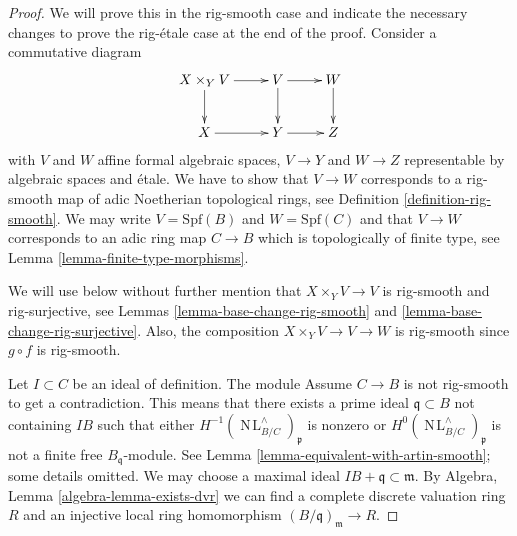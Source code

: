 \documentclass{stacks-project}
\theoremstyle{plain}
\theoremstyle{definition}
\theoremstyle{remark}
\numberwithin{equation}{subsection}
\def\NL{\mathop{N\!L}\nolimits}
\begin{document}
\begin{proof}
We will prove this in the rig-smooth case and indicate the necessary
changes to prove the rig-\'etale case at the end of the proof.
Consider a commutative diagram
$$
\xymatrix{
X \times_Y V \ar[r] \ar[d] &
V \ar[d] \ar[r] &
W \ar[d] \\
X \ar[r] &
Y \ar[r] &
Z
}
$$
with $V$ and $W$ affine formal algebraic spaces, $V \to Y$ and $W \to Z$
representable by algebraic spaces and \'etale. We have to show that
$V \to W$ corresponds to a rig-smooth map of adic Noetherian topological
rings, see Definition \ref{definition-rig-smooth}.
We may write $V = \text{Spf}(B)$ and $W = \text{Spf}(C)$ and that
$V \to W$ corresponds to an adic ring map $C \to B$ which is topologically
of finite type, see Lemma \ref{lemma-finite-type-morphisms}.

\medskip\noindent
We will use below without further mention that $X \times_Y V \to V$
is rig-smooth and rig-surjective, see
Lemmas \ref{lemma-base-change-rig-smooth} and
\ref{lemma-base-change-rig-surjective}.
Also, the composition $X \times_Y V \to V \to W$ is rig-smooth
since $g \circ f$ is rig-smooth.

\medskip\noindent
Let $I \subset C$ be an ideal of definition. The module
Assume $C \to B$ is not rig-smooth to get a contradiction.
This means that there exists a prime ideal $\mathfrak q \subset B$
not containing $IB$ such that either $H^{-1}(\NL_{B/C}^\wedge)_\mathfrak p$
is nonzero or $H^0(\NL_{B/C}^\wedge)_\mathfrak p$ is not a finite free
$B_\mathfrak q$-module. See
Lemma \ref{lemma-equivalent-with-artin-smooth}; some details
omitted. We may choose a maximal ideal
$IB + \mathfrak q \subset \mathfrak m$. By
Algebra, Lemma \ref{algebra-lemma-exists-dvr}
we can find a complete discrete valuation ring $R$ and an injective
local ring homomorphism $(B/\mathfrak q)_\mathfrak m \to R$.


\end{proof}
\end{document}
